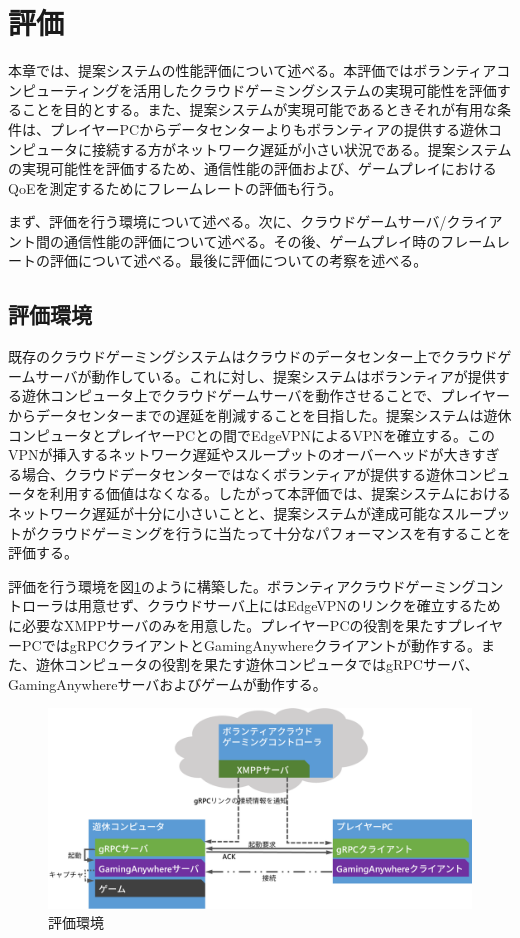\section{評価}
本章では、提案システムの性能評価について述べる。本評価ではボランティアコンピューティングを活用したクラウドゲーミングシステムの実現可能性を評価することを目的とする。また、提案システムが実現可能であるときそれが有用な条件は、プレイヤーPCからデータセンターよりもボランティアの提供する遊休コンピュータに接続する方がネットワーク遅延が小さい状況である。提案システムの実現可能性を評価するため、通信性能の評価および、ゲームプレイにおけるQoEを測定するためにフレームレートの評価も行う。

まず、評価を行う環境について述べる。次に、クラウドゲームサーバ/クライアント間の通信性能の評価について述べる。その後、ゲームプレイ時のフレームレートの評価について述べる。最後に評価についての考察を述べる。

\subsection{評価環境}
既存のクラウドゲーミングシステムはクラウドのデータセンター上でクラウドゲームサーバが動作している。これに対し、提案システムはボランティアが提供する遊休コンピュータ上でクラウドゲームサーバを動作させることで、プレイヤーからデータセンターまでの遅延を削減することを目指した。提案システムは遊休コンピュータとプレイヤーPCとの間でEdgeVPNによるVPNを確立する。このVPNが挿入するネットワーク遅延やスループットのオーバーヘッドが大きすぎる場合、クラウドデータセンターではなくボランティアが提供する遊休コンピュータを利用する価値はなくなる。したがって本評価では、提案システムにおけるネットワーク遅延が十分に小さいことと、提案システムが達成可能なスループットがクラウドゲーミングを行うに当たって十分なパフォーマンスを有することを評価する。

評価を行う環境を図\ref{fig:expenv}のように構築した。ボランティアクラウドゲーミングコントローラは用意せず、クラウドサーバ上にはEdgeVPNのリンクを確立するために必要なXMPPサーバのみを用意した。プレイヤーPCの役割を果たすプレイヤーPCではgRPCクライアントとGamingAnywhereクライアントが動作する。また、遊休コンピュータの役割を果たす遊休コンピュータではgRPCサーバ、GamingAnywhereサーバおよびゲームが動作する。

\begin{figure}[t]
    \centering
    \includegraphics[width=\textwidth,keepaspectratio,clip]{img/experimentalenvironment.eps}
    \caption{評価環境}
    \label{fig:expenv}
\end{figure}

